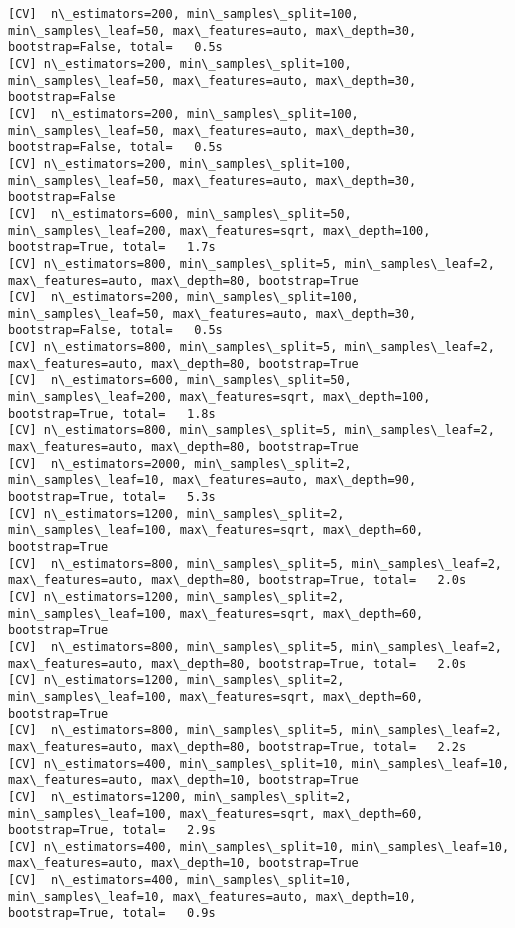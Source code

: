 \documentclass[11pt]{article}
\begin{document}
\begin{Verbatim}[commandchars=\\\{\}]
[CV]  n\_estimators=200, min\_samples\_split=100, min\_samples\_leaf=50, max\_features=auto, max\_depth=30, bootstrap=False, total=   0.5s
[CV] n\_estimators=200, min\_samples\_split=100, min\_samples\_leaf=50, max\_features=auto, max\_depth=30, bootstrap=False 
[CV]  n\_estimators=200, min\_samples\_split=100, min\_samples\_leaf=50, max\_features=auto, max\_depth=30, bootstrap=False, total=   0.5s
[CV] n\_estimators=200, min\_samples\_split=100, min\_samples\_leaf=50, max\_features=auto, max\_depth=30, bootstrap=False 
[CV]  n\_estimators=600, min\_samples\_split=50, min\_samples\_leaf=200, max\_features=sqrt, max\_depth=100, bootstrap=True, total=   1.7s
[CV] n\_estimators=800, min\_samples\_split=5, min\_samples\_leaf=2, max\_features=auto, max\_depth=80, bootstrap=True 
[CV]  n\_estimators=200, min\_samples\_split=100, min\_samples\_leaf=50, max\_features=auto, max\_depth=30, bootstrap=False, total=   0.5s
[CV] n\_estimators=800, min\_samples\_split=5, min\_samples\_leaf=2, max\_features=auto, max\_depth=80, bootstrap=True 
[CV]  n\_estimators=600, min\_samples\_split=50, min\_samples\_leaf=200, max\_features=sqrt, max\_depth=100, bootstrap=True, total=   1.8s
[CV] n\_estimators=800, min\_samples\_split=5, min\_samples\_leaf=2, max\_features=auto, max\_depth=80, bootstrap=True 
[CV]  n\_estimators=2000, min\_samples\_split=2, min\_samples\_leaf=10, max\_features=auto, max\_depth=90, bootstrap=True, total=   5.3s
[CV] n\_estimators=1200, min\_samples\_split=2, min\_samples\_leaf=100, max\_features=sqrt, max\_depth=60, bootstrap=True 
[CV]  n\_estimators=800, min\_samples\_split=5, min\_samples\_leaf=2, max\_features=auto, max\_depth=80, bootstrap=True, total=   2.0s
[CV] n\_estimators=1200, min\_samples\_split=2, min\_samples\_leaf=100, max\_features=sqrt, max\_depth=60, bootstrap=True 
[CV]  n\_estimators=800, min\_samples\_split=5, min\_samples\_leaf=2, max\_features=auto, max\_depth=80, bootstrap=True, total=   2.0s
[CV] n\_estimators=1200, min\_samples\_split=2, min\_samples\_leaf=100, max\_features=sqrt, max\_depth=60, bootstrap=True 
[CV]  n\_estimators=800, min\_samples\_split=5, min\_samples\_leaf=2, max\_features=auto, max\_depth=80, bootstrap=True, total=   2.2s
[CV] n\_estimators=400, min\_samples\_split=10, min\_samples\_leaf=10, max\_features=auto, max\_depth=10, bootstrap=True 
[CV]  n\_estimators=1200, min\_samples\_split=2, min\_samples\_leaf=100, max\_features=sqrt, max\_depth=60, bootstrap=True, total=   2.9s
[CV] n\_estimators=400, min\_samples\_split=10, min\_samples\_leaf=10, max\_features=auto, max\_depth=10, bootstrap=True 
[CV]  n\_estimators=400, min\_samples\_split=10, min\_samples\_leaf=10, max\_features=auto, max\_depth=10, bootstrap=True, total=   0.9s

\end{Verbatim}
\end{document}
